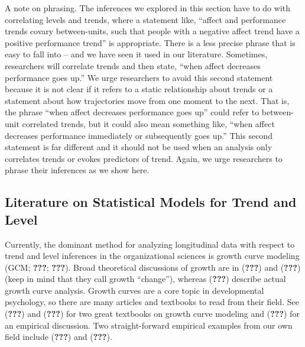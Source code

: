 \documentclass[english,,man]{apa6}
\begin{document}
A note on phrasing. The inferences we explored in this section have to do with correlating levels and trends, where a statement like, \enquote{affect and performance trends covary between-units, such that people with a negative affect trend have a positive performance trend} is appropriate. There is a less precise phrase that is easy to fall into -- and we have seen it used in our literature. Sometimes, researchers will correlate trends and then state, \enquote{when affect decreases performance goes up.} We urge researchers to avoid this second statement because it is not clear if it refers to a static relationship about trends or a statement about how trajectories move from one moment to the next. That is, the phrase \enquote{when affect decreases performance goes up} could refer to between-unit correlated trends, but it could also mean something like, \enquote{when affect decreases performance immediately or subsequently goes up.} This second statement is far different and it should not be used when an analysis only correlates trends or evokes predictors of trend. Again, we urge researchers to phrase their inferences as we show here.

\hypertarget{literature-on-statistical-models-for-trend-and-level}{%
\subsection{Literature on Statistical Models for Trend and Level}\label{literature-on-statistical-models-for-trend-and-level}}

Currently, the dominant method for analyzing longitudinal data with respect to trend and level inferences in the organizational sciences is growth curve modeling (GCM; {\textbf{???}}; {\textbf{???}}). Broad theoretical discussions of growth are in ({\textbf{???}}) and ({\textbf{???}}) (keep in mind that they call growth \enquote{change}), whereas ({\textbf{???}}) describe actual growth curve analysis. Growth curves are a core topic in developmental psychology, so there are many articles and textbooks to read from their field. See ({\textbf{???}}) and ({\textbf{???}}) for two great textbooks on growth curve modeling and ({\textbf{???}}) for an empirical discussion. Two straight-forward empirical examples from our own field include ({\textbf{???}}) and ({\textbf{???}}).
\end{document}
